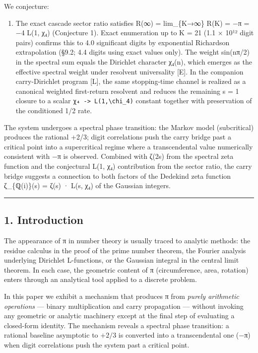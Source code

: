\documentclass[
  11pt,
]{article}
\providecommand{\tightlist}{%
  \setlength{\itemsep}{0pt}\setlength{\parskip}{0pt}}
\begin{document}
We conjecture:

\begin{enumerate}
\def\labelenumi{\arabic{enumi}.}
\setcounter{enumi}{5}
\tightlist
\item
  The exact cascade sector ratio satisfies R(∞) = lim\_\{K→∞\} R(K) = −π = −4
  L(1, χ₄) (Conjecture 1). Exact enumeration up to K = 21 (1.1 × 10¹² digit
  pairs) confirms this to 4.0 significant digits by exponential Richardson
  extrapolation (§9.2; 4.4 digits using exact values only). The weight sin(nπ/2)
  in the spectral sum equals the Dirichlet character χ₄(n), which emerges as the
  effective spectral weight under resolvent universality {[}E{]}. In the
  companion carry-Dirichlet program {[}L{]}, the same stopping-time channel is
  realized as a canonical weighted first-return resolvent and reduces the
  remaining s = 1 closure to a scalar
  \texttt{χ₄\ -\textgreater{}\ L(1,\textbackslash{}chi\_4)} constant together
  with preservation of the conditioned 1/2 rate.
\end{enumerate}

The system undergoes a spectral phase transition: the Markov model (subcritical)
produces the rational +2/3; digit correlations push the carry bridge past a
critical point into a supercritical regime where a transcendental value
numerically consistent with −π is observed. Combined with ζ(2s) from the
spectral zeta function and the conjectural L(1, χ₄) contribution from the sector
ratio, the carry bridge suggests a connection to both factors of the Dedekind
zeta function ζ\_\{ℚ(i)\}(s) = ζ(s) · L(s, χ₄) of the Gaussian integers.

\begin{center}\rule{0.5\linewidth}{0.5pt}\end{center}

\newpage

\subsection{1. Introduction}\label{introduction}

The appearance of π in number theory is usually traced to analytic methods: the
residue calculus in the proof of the prime number theorem, the Fourier analysis
underlying Dirichlet L-functions, or the Gaussian integral in the central limit
theorem. In each case, the geometric content of π (circumference, area,
rotation) enters through an analytical tool applied to a discrete problem.

In this paper we exhibit a mechanism that produces π from \emph{purely
arithmetic operations} --- binary multiplication and carry propagation ---
without invoking any geometric or analytic machinery except at the final step of
evaluating a closed-form identity. The mechanism reveals a spectral phase
transition: a rational baseline asymptotic to \(+2/3\) is converted into a
transcendental one (−π) when digit correlations push the system past a critical
point.
\end{document}
